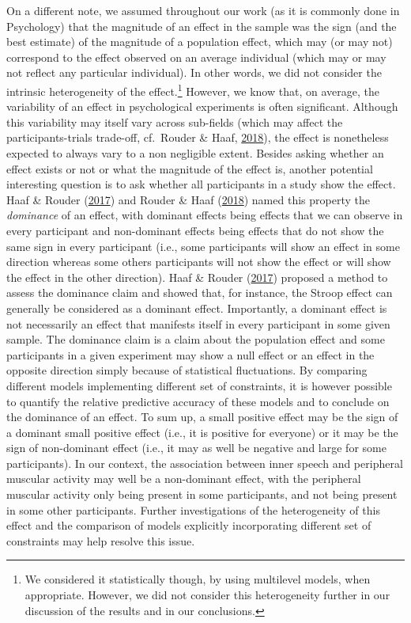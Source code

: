 \documentclass[a4paper,12pt,twoside,openright,oldfontcommands,final]{memoir}
\let\rmarkdownfootnote\footnote%
\def\footnote{\protect\rmarkdownfootnote}
\begin{document}
On a different note, we assumed throughout our work (as it is commonly done in Psychology) that the magnitude of an effect in the sample was the sign (and the best estimate) of the magnitude of a population effect, which may (or may not) correspond to the effect observed on an average individual (which may or may not reflect any particular individual). In other words, we did not consider the intrinsic heterogeneity of the effect.\footnote{We considered it statistically though, by using multilevel models, when appropriate. However, we did not consider this heterogeneity further in our discussion of the results and in our conclusions.} However, we know that, on average, the variability of an effect in psychological experiments is often significant. Although this variability may itself vary across sub-fields (which may affect the participants-trials trade-off, cf.~Rouder \& Haaf, \protect\hyperlink{ref-rouder_power_2018}{2018}), the effect is nonetheless expected to always vary to a non negligible extent. Besides asking whether an effect exists or not or what the magnitude of the effect is, another potential interesting question is to ask whether all participants in a study show the effect. Haaf \& Rouder (\protect\hyperlink{ref-haaf_developing_2017}{2017}) and Rouder \& Haaf (\protect\hyperlink{ref-rouder_power_2018}{2018}) named this property the \emph{dominance} of an effect, with dominant effects being effects that we can observe in every participant and non-dominant effects being effects that do not show the same sign in every participant (i.e., some participants will show an effect in some direction whereas some others participants will not show the effect or will show the effect in the other direction). Haaf \& Rouder (\protect\hyperlink{ref-haaf_developing_2017}{2017}) proposed a method to assess the dominance claim and showed that, for instance, the Stroop effect can generally be considered as a dominant effect. Importantly, a dominant effect is not necessarily an effect that manifests itself in every participant in some given sample. The dominance claim is a claim about the population effect and some participants in a given experiment may show a null effect or an effect in the opposite direction simply because of statistical fluctuations. By comparing different models implementing different set of constraints, it is however possible to quantify the relative predictive accuracy of these models and to conclude on the dominance of an effect. To sum up, a small positive effect may be the sign of a dominant small positive effect (i.e., it is positive for everyone) or it may be the sign of non-dominant effect (i.e., it may as well be negative and large for some participants). In our context, the association between inner speech and peripheral muscular activity may well be a non-dominant effect, with the peripheral muscular activity only being present in some participants, and not being present in some other participants. Further investigations of the heterogeneity of this effect and the comparison of models explicitly incorporating different set of constraints may help resolve this issue.
\end{document}
